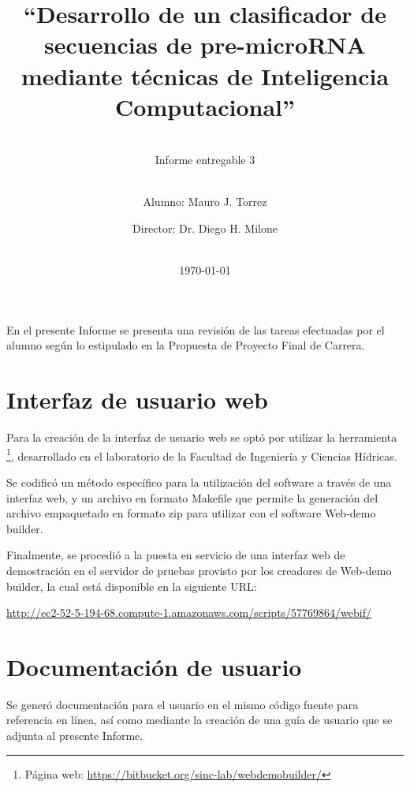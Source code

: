\documentclass[12pt,bibliography=oldstyle,DIV=12,parskip=half-,titlepage]{scrartcl}
\begin{document}
%
%
\titlehead{\center\large
    Universidad Nacional del Litoral\\
    Facultad de Ingeniería y Ciencias Hídricas
}
%
%
\title{\LARGE ``Desarrollo de un clasificador de secuencias de pre-microRNA
  mediante técnicas de Inteligencia Computacional''}
\subject{Proyecto Final de Carrera\\Ingeniería en
  Informática}
\subtitle{~\\[.2ex]Informe entregable 3\\[.2ex]~}
\author{{Alumno: Mauro J. Torrez}\and{Director: Dr. Diego H. Milone}}
%
\date{~\\[2em]\today}
%
\renewcommand*{\titlepagestyle}{empty}
\maketitle
\setcounter{page}{1}
%
%
En el presente Informe se presenta una revisión de las tareas
efectuadas por el alumno según lo estipulado en la Propuesta de
Proyecto Final de Carrera.
%
%
\section{Interfaz de usuario web}
%
Para la creación de la interfaz de usuario web se optó por utilizar la
herramienta \footnote{Página web:
  \url{https://bitbucket.org/sinc-lab/webdemobuilder/}}, desarrollado
en el laboratorio  de la Facultad de Ingeniería y
Ciencias Hídricas.

Se codificó un método específico para la utilización del software a
través de una interfaz web, y un archivo en formato {\mono Makefile}
que permite la generación del archivo empaquetado en formato zip para
utilizar con el software Web-demo builder.

Finalmente, se procedió a la puesta en servicio de una interfaz web de
demostración en el servidor de pruebas provisto por los creadores de
Web-demo builder, la cual está disponible en la siguiente URL:

\url{http://ec2-52-5-194-68.compute-1.amazonaws.com/scripts/57769864/webif/}
%
%
\section{Documentación de usuario}
%
Se generó documentación para el usuario en el mismo código fuente para
referencia en línea, así como mediante la creación de una guía de
usuario que se adjunta al presente Informe.
\end{document}
